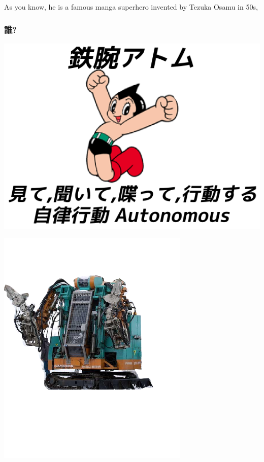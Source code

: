 \begin{resume}
As you know, he is a famous manga superhero invented by Tezuka Osamu in 50s,
\end{resume}

\subsubsection{誰?}
\label{sec-4-1-2}

\begin{container-fluid}
\begin{row-fluid}
\begin{span6}
\includegraphics{img/astro/final.png}
\end{span6}
\begin{span6}
\includegraphics{img/rescue/1.png}
\end{span6}
\end{row-fluid}
\end{container-fluid}

